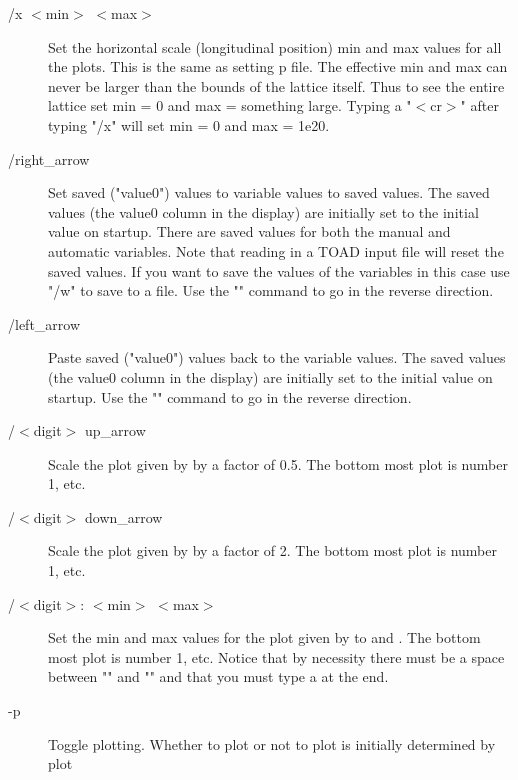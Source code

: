 \begin{description}
\item[/x $<$min$>$ $<$max$>$]
Set the horizontal scale (longitudinal position) min and max values for all
the plots. This is the same as setting p%
file. The effective min and max can never be larger than the bounds of the
lattice itself. Thus to see the entire lattice set min = 0 and max = something
large. Typing a "$<$cr$>$" after typing "/x" will set min = 0 and max = 1e20.

\item[/right\_arrow]
Set saved ("value0") values to variable values to saved values. 
The saved values (the value0 column in the display) are initially set to  the
initial value on startup. There are saved values for both the manual and
automatic variables. Note that reading in a TOAD input file will reset the
saved values. If you want to save the values of the variables in this case use
"/w" to save to a file. Use the "" command to go in the
reverse direction.

\item[/left\_arrow]
Paste saved ("value0") values back to the variable values. 
The saved values (the value0 column in the display) are initially set to the
initial value  on startup. Use the "" command to go in the
reverse direction.

\item[/$<$digit$>$ up\_arrow]
Scale the plot given by  by a factor of 0.5. The bottom most plot
is number 1, etc. 

\item[/$<$digit$>$ down\_arrow]
Scale the plot given by  by a factor of 2. The bottom most plot is
number 1, etc. 

\item[/$<$digit$>$: $<$min$>$ $<$max$>$]
Set the min and max values for the plot given by  to 
and . The bottom most plot is number 1, etc. Notice that by
necessity there must be a space between "" and "" and
that you must type a  at the end.

\item[-p]
Toggle plotting. Whether to plot or not to plot is initially determined by
plot%

\end{description}
